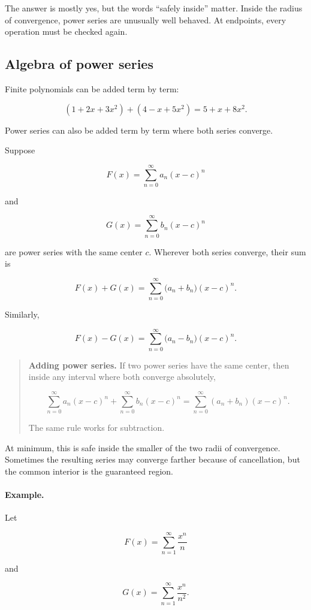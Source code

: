 The answer is mostly yes, but the words ``safely inside'' matter.  Inside the radius of
convergence, power series are unusually well behaved.  At endpoints, every operation
must be checked again.

\subsection{Algebra of power series}
\label{subsec:algebra-of-power-series}

Finite polynomials can be added term by term:

\[
(1+2x+3x^2)+(4-x+5x^2)=5+x+8x^2.
\]

Power series can also be added term by term where both series converge.

Suppose

\[
F(x)=\sum_{n=0}^{\infty} a_n(x-c)^n
\]

and

\[
G(x)=\sum_{n=0}^{\infty} b_n(x-c)^n
\]

are power series with the same center \(c\).  Wherever both series converge, their
sum is

\[
F(x)+G(x)
=
\sum_{n=0}^{\infty}\bigl(a_n+b_n\bigr)(x-c)^n.
\]

Similarly,

\[
F(x)-G(x)
=
\sum_{n=0}^{\infty}\bigl(a_n-b_n\bigr)(x-c)^n.
\]

\begin{quote}
\textbf{Adding power series.}
If two power series have the same center, then inside any interval where both
converge absolutely,

\[
\boxed{
\sum_{n=0}^{\infty} a_n(x-c)^n
+
\sum_{n=0}^{\infty} b_n(x-c)^n
=
\sum_{n=0}^{\infty}(a_n+b_n)(x-c)^n.
}
\]

The same rule works for subtraction.
\end{quote}

At minimum, this is safe inside the smaller of the two radii of convergence.  Sometimes
the resulting series may converge farther because of cancellation, but the common
interior is the guaranteed region.

\paragraph{Example.}
Let

\[
F(x)=\sum_{n=1}^{\infty}\frac{x^n}{n}
\]

and

\[
G(x)=\sum_{n=1}^{\infty}\frac{x^n}{n^2}.
\]

